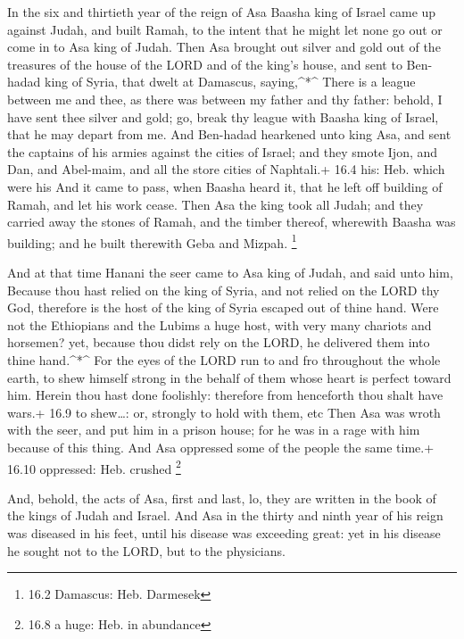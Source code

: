  In the six and thirtieth year of the reign of Asa Baasha
king of Israel came up against Judah, and built Ramah, to the intent
that he might let none go out or come in to Asa king of Judah.
 Then Asa brought out silver and gold out of the treasures
of the house of the LORD and of the king's house, and sent to Ben-hadad
king of Syria, that dwelt at Damascus, saying,\^{}*\^{} 
There is a league between me and thee, as there was between my father
and thy father: behold, I have sent thee silver and gold; go, break thy
league with Baasha king of Israel, that he may depart from me.
 And Ben-hadad hearkened unto king Asa, and sent the
captains of his armies against the cities of Israel; and they smote
Ijon, and Dan, and Abel-maim, and all the store cities of Naphtali.+
16.4 his: Heb. which were his  And it came to pass, when
Baasha heard it, that he left off building of Ramah, and let his work
cease.  Then Asa the king took all Judah; and they carried
away the stones of Ramah, and the timber thereof, wherewith Baasha was
building; and he built therewith Geba and Mizpah. \footnote{16.2
  Damascus: Heb. Darmesek}

 And at that time Hanani the seer came to Asa king of Judah,
and said unto him, Because thou hast relied on the king of Syria, and
not relied on the LORD thy God, therefore is the host of the king of
Syria escaped out of thine hand.  Were not the Ethiopians
and the Lubims a huge host, with very many chariots and horsemen? yet,
because thou didst rely on the LORD, he delivered them into thine
hand.\^{}*\^{}  For the eyes of the LORD run to and fro
throughout the whole earth, to shew himself strong in the behalf of them
whose heart is perfect toward him. Herein thou hast done foolishly:
therefore from henceforth thou shalt have wars.+ 16.9 to shew\ldots: or,
strongly to hold with them, etc  Then Asa was wroth with
the seer, and put him in a prison house; for he was in a rage with him
because of this thing. And Asa oppressed some of the people the same
time.+ 16.10 oppressed: Heb. crushed \footnote{16.8 a huge: Heb. in
  abundance}

 And, behold, the acts of Asa, first and last, lo, they are
written in the book of the kings of Judah and Israel.  And
Asa in the thirty and ninth year of his reign was diseased in his feet,
until his disease was exceeding great: yet in his disease he sought not
to the LORD, but to the physicians.

